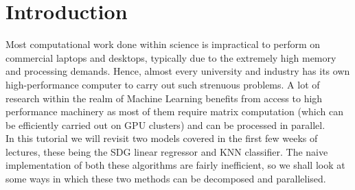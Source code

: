 \section{Introduction}
Most computational work done within science is impractical to perform on commercial laptops and desktops, typically due to the extremely high memory and processing demands. Hence, almost every university and industry has its own high-performance computer to carry out such strenuous problems. A lot of research within the realm of Machine Learning benefits from access to high performance machinery as most of them require matrix computation (which can be efficiently carried out on GPU clusters) and can be processed in parallel.\\[1\baselineskip]
In this tutorial we will revisit two models covered in the first few weeks of lectures, these being the SDG linear regressor and KNN classifier. The naive implementation of both these algorithms are fairly inefficient, so we shall look at some ways in which these two methods can be decomposed and parallelised.